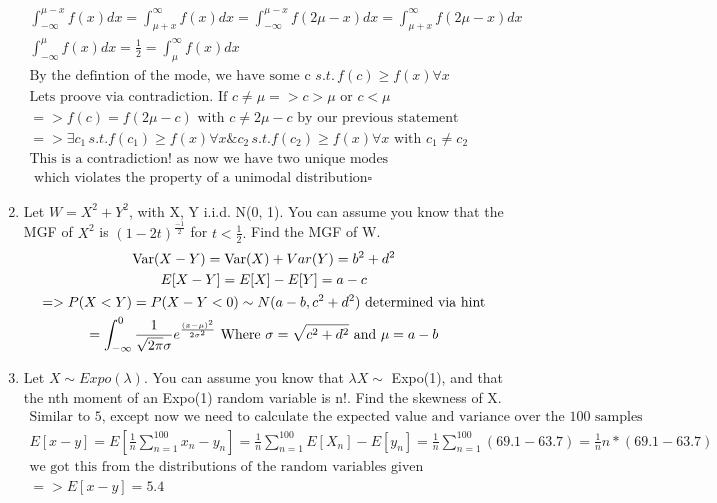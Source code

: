 \documentclass[11pt]{article}
\newcommand{\Var}{\mathop{\rm Var}}
\begin{document}
\begin{enumerate}
\begin{gather}
	\int_{-\infty}^{\mu - x} f(x)dx = \int_{\mu + x}^{\infty} f(x)dx = \int_{-\infty}^{\mu - x} f(2\mu - x)dx = \int_{\mu + x}^{\infty} f(2\mu - x)dx\\
	\int_{-\infty}^{\mu} f(x)dx = \frac{1}{2}= \int_{\mu}^{\infty} f(x)dx\\
	\text{By the defintion of the mode, we have some c } s.t. \, f(c) \ge f(x) \forall x\\
	\text{Lets proove via contradiction. If } c \ne \mu => c > \mu \text{ or } c<\mu\\
	=> f(c) = f(2\mu - c) \text{ with } c \ne 2\mu-c \text{ by our previous statement}\\
	=> \exists c_1 \, s.t. f(c_1)\ge f(x) \forall x \& c_2 \, s.t. f(c_2)\ge f(x) \forall x \text{ with } c_1 \ne c_2\\
	\text{This is a contradiction! as now we have two unique modes}\\
	\text{ which violates the property of a unimodal distribution} \square
\end{gather}
\item Let $W = X^2 + Y^2$, with X, Y i.i.d. N(0, 1). You can assume you know that the MGF of $X^2$ is $(1 - 2t)^{\frac{-1}{2}}$ for $t < \frac{1}{2}.$ 
Find the MGF of W.
\begin{gather}
	\Var(X-Y) = \Var(X) + Var(Y) = b^2 + d^2\\
	E[X-Y] = E[X] - E[Y] = a - c\\
	=>	P(X<Y) = P(X-Y < 0) \sim N(a-b,c^2 + d^2) \text{ determined via hint}\\
		= \int_{-\infty}^{0} \frac{1}{\sqrt{2\pi} \sigma} e ^ {\frac{(x-\mu)^2}{2\sigma ^2}} \text{ Where } \sigma = \sqrt{c^2 + d^2} \text{ and } \mu = a-b
\end{gather}
\item Let $X \sim Expo(\lambda)$. You can assume you know that $\lambda X \sim$ Expo(1), and that the nth moment of an Expo(1) random variable is n!. Find the skewness of X.
\begin{gather}
	\text{Similar to 5, except now we need to calculate the expected value and variance over the 100 samples}\\
	E[x-y] = E[\frac{1}{n}\sum_{n=1}^{100} x_n-y_n] =\frac{1}{n}\sum_{n=1}^{100} E[X_n] - E[y_n] =\frac{1}{n}\sum_{n=1}^{100} (69.1-63.7) = \frac{1}{n} n*(69.1-63.7) \\
	\text{we got this from the distributions of the random variables given}\\
	=> E[x-y] = 5.4\\

\end{gather}
\end{enumerate}
\end{document}
